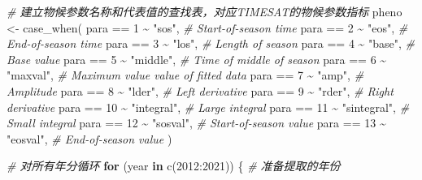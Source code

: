 \documentclass[
]{article}
\newenvironment{Shaded}{\begin{snugshade}}{\end{snugshade}}
\newcommand{\CommentTok}[1]{\textcolor[rgb]{0.56,0.35,0.01}{\textit{#1}}}
\newcommand{\ControlFlowTok}[1]{\textcolor[rgb]{0.13,0.29,0.53}{\textbf{#1}}}
\newcommand{\DecValTok}[1]{\textcolor[rgb]{0.00,0.00,0.81}{#1}}
\newcommand{\FunctionTok}[1]{\textcolor[rgb]{0.00,0.00,0.00}{#1}}
\newcommand{\NormalTok}[1]{#1}
\newcommand{\OtherTok}[1]{\textcolor[rgb]{0.56,0.35,0.01}{#1}}
\newcommand{\SpecialCharTok}[1]{\textcolor[rgb]{0.00,0.00,0.00}{#1}}
\newcommand{\StringTok}[1]{\textcolor[rgb]{0.31,0.60,0.02}{#1}}
\begin{document}
\begin{Shaded}
\begin{Highlighting}[]
  \CommentTok{\# 建立物候参数名称和代表值的查找表，对应TIMESAT的物候参数指标}
\NormalTok{  pheno }\OtherTok{\textless{}{-}} \FunctionTok{case\_when}\NormalTok{(}
\NormalTok{              para }\SpecialCharTok{==} \DecValTok{1} \SpecialCharTok{\textasciitilde{}} \StringTok{"sos"}\NormalTok{,       }\CommentTok{\# Start{-}of{-}season time}
\NormalTok{              para }\SpecialCharTok{==} \DecValTok{2} \SpecialCharTok{\textasciitilde{}} \StringTok{"eos"}\NormalTok{,       }\CommentTok{\# End{-}of{-}season time}
\NormalTok{              para }\SpecialCharTok{==} \DecValTok{3} \SpecialCharTok{\textasciitilde{}} \StringTok{"los"}\NormalTok{,       }\CommentTok{\# Length of season}
\NormalTok{              para }\SpecialCharTok{==} \DecValTok{4} \SpecialCharTok{\textasciitilde{}} \StringTok{"base"}\NormalTok{,      }\CommentTok{\# Base value}
\NormalTok{              para }\SpecialCharTok{==} \DecValTok{5} \SpecialCharTok{\textasciitilde{}} \StringTok{"middle"}\NormalTok{,    }\CommentTok{\# Time of middle of season}
\NormalTok{              para }\SpecialCharTok{==} \DecValTok{6} \SpecialCharTok{\textasciitilde{}} \StringTok{"maxval"}\NormalTok{,    }\CommentTok{\# Maximum value value of fitted data}
\NormalTok{              para }\SpecialCharTok{==} \DecValTok{7} \SpecialCharTok{\textasciitilde{}} \StringTok{"amp"}\NormalTok{,       }\CommentTok{\# Amplitude}
\NormalTok{              para }\SpecialCharTok{==} \DecValTok{8} \SpecialCharTok{\textasciitilde{}} \StringTok{"lder"}\NormalTok{,    }\CommentTok{\# Left derivative}
\NormalTok{              para }\SpecialCharTok{==} \DecValTok{9} \SpecialCharTok{\textasciitilde{}} \StringTok{"rder"}\NormalTok{,    }\CommentTok{\# Right derivative}
\NormalTok{              para }\SpecialCharTok{==} \DecValTok{10} \SpecialCharTok{\textasciitilde{}} \StringTok{"integral"}\NormalTok{, }\CommentTok{\# Large integral}
\NormalTok{              para }\SpecialCharTok{==} \DecValTok{11} \SpecialCharTok{\textasciitilde{}} \StringTok{"sintegral"}\NormalTok{,    }\CommentTok{\# Small integral}
\NormalTok{              para }\SpecialCharTok{==} \DecValTok{12} \SpecialCharTok{\textasciitilde{}} \StringTok{"sosval"}\NormalTok{,    }\CommentTok{\# Start{-}of{-}season value}
\NormalTok{              para }\SpecialCharTok{==} \DecValTok{13} \SpecialCharTok{\textasciitilde{}} \StringTok{"eosval"}\NormalTok{,    }\CommentTok{\# End{-}of{-}season value}
\NormalTok{            )}
  
    \CommentTok{\# 对所有年分循环}
  \ControlFlowTok{for}\NormalTok{ (year }\ControlFlowTok{in} \FunctionTok{c}\NormalTok{(}\DecValTok{2012}\SpecialCharTok{:}\DecValTok{2021}\NormalTok{)) \{   }\CommentTok{\# 准备提取的年份}
    

\end{Highlighting}
\end{Shaded}
\end{document}
